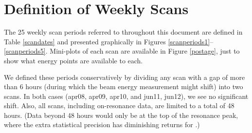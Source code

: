 \documentclass[aps,prd,preprint,superscriptaddress,tightenlines,nofootinbib,floatfix]{revtex4}
\begin{document}
\appendix

\section{Definition of Weekly Scans} \label{sec:scans}

The 25 weekly scan periods referred to throughout this document are
defined in Table \ref{scandates} and presented graphically in Figures
\ref{scanperiods1}--\ref{scanperiods5}.  Mini-plots of each scan are
available in Figure \ref{postage}, just to show what energy points are
available to each.

We defined these periods conservatively by dividing any scan with a
gap of more than 6 hours (during which the beam energy measurement
might shift) into two scans.  In both cases (apr08, apr09, apr10, and
jun11, jun12), we see no significant shift.  Also, all scans,
including on-resonance data, are limited to a total of 48 hours.
(Data beyond 48 hours would only be at the top of the resonance peak,
where the extra statistical precision has diminishing returns for
\gee.)
\end{document}
